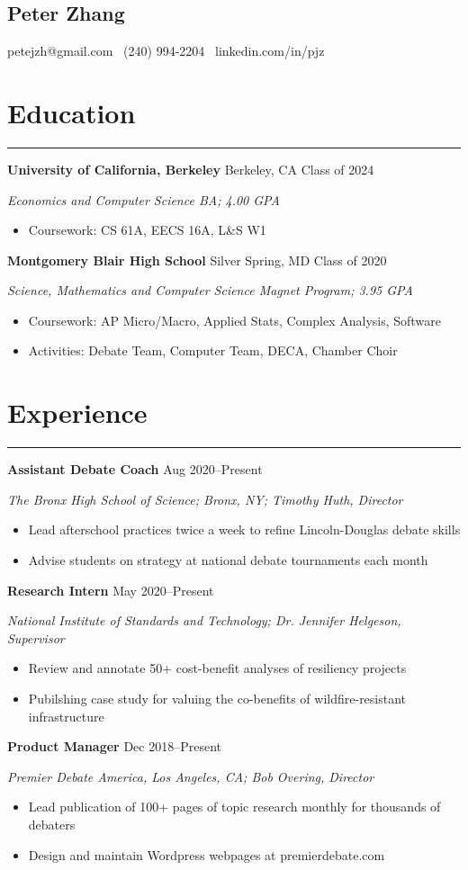 \documentclass[11pt]{article}
\newcommand{\name}[1]{\begin{center}\section*{\huge \color{highlight} #1}\end{center}}
\newcommand{\topinfo}[1]{\begin{center}\vspace{-0.2cm}#1\vspace{-0.2cm}\end{center}}
\newcommand{\resumesection}[1]{\vspace{-0.3cm}\section*{\color{highlight}#1}\vspace{-0.3cm}\hrule\vspace{0.3cm}}
\begin{document}
\name{Peter Zhang}
\topinfo{petejzh@gmail.com \textbullet\ (240) 994-2204 \textbullet\ linkedin.com/in/pjz}

\resumesection{Education}

\textbf{University of California, Berkeley} Berkeley, CA \hfill Class of 2024 \par
\textit{Economics and Computer Science BA; 4.00 GPA}
\begin{itemize}
	\item Coursework: CS 61A, EECS 16A, L\&S W1
\end{itemize}

\textbf{Montgomery Blair High School} Silver Spring, MD \hfill Class of 2020 \par
\textit{Science, Mathematics and Computer Science Magnet Program; 3.95 GPA}

\begin{itemize}
	\item Coursework: AP Micro/Macro, Applied Stats, Complex Analysis, Software
	\item Activities: Debate Team, Computer Team, DECA, Chamber Choir
\end{itemize}

\resumesection{Experience}

\textbf{Assistant Debate Coach}  \hfill Aug 2020--Present \par
\textit{The Bronx High School of Science; Bronx, NY; Timothy Huth, Director}
\begin{itemize}
	\item Lead afterschool practices twice a week to refine Lincoln-Douglas debate skills
	\item Advise students on strategy at national debate tournaments each month
\end{itemize}

\textbf{Research Intern} \hfill May 2020--Present\par
\textit{National Institute of Standards and Technology; Dr. Jennifer Helgeson, Supervisor}
\begin{itemize}
	\item Review and annotate 50+ cost-benefit analyses of resiliency projects
	\item Pubilshing case study for valuing the co-benefits of wildfire-resistant infrastructure
\end{itemize}\vspace{0.1cm}

\textbf{Product Manager} \hfill Dec 2018--Present \par
\textit{Premier Debate America, Los Angeles, CA; Bob Overing, Director}
\begin{itemize}
	\item Lead publication of 100+ pages of topic research monthly for thousands of debaters
	\item Design and maintain Wordpress webpages at premierdebate.com
\end{itemize}
\end{document}
